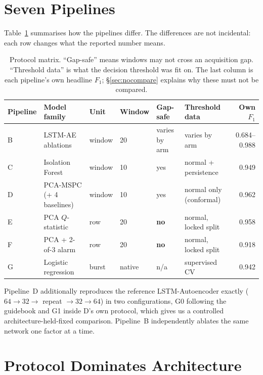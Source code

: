\documentclass{article}
\begin{document}
\section{Seven Pipelines}
\label{sec:pipelines}

Table~\ref{tab:protocols} summarises how the pipelines differ. The differences
are not incidental: each row changes what the reported number means.

\begin{table}[t]
\caption{Protocol matrix. ``Gap-safe'' means windows may not cross an
acquisition gap. ``Threshold data'' is what the decision threshold was fit on.
The last column is each pipeline's own headline $F_1$; \S\ref{sec:nocompare}
explains why these must not be compared.}
\label{tab:protocols}
\vskip 0.1in
\centering
\small
\begin{tabular}{llllllr}
\toprule
Pipeline & Model family & Unit & Window & Gap-safe & Threshold data & Own $F_1$ \\
\midrule
B  & LSTM-AE ablations        & window & 20     & varies by arm & varies by arm  & 0.684--0.988 \\
C  & Isolation Forest         & window & 10     & yes & normal + persistence   & 0.949 \\
D  & PCA-MSPC (+ 4 baselines) & window & 10     & yes & normal only (conformal) & 0.962 \\
E  & PCA $Q$-statistic        & row    & 20     & \textbf{no}  & normal, locked split & 0.958 \\
F  & PCA + 2-of-3 alarm       & row    & 20     & \textbf{no}  & normal, locked split & 0.918 \\
G  & Logistic regression      & burst  & native & n/a & supervised CV          & 0.942 \\
\bottomrule
\end{tabular}
\end{table}

Pipeline~D additionally reproduces the reference LSTM-Autoencoder exactly
($64\!\to\!32\!\to$ repeat $\to\!32\!\to\!64$) in two configurations, G0
following the guidebook and G1 inside D's own protocol, which gives us a
controlled architecture-held-fixed comparison. Pipeline~B independently ablates
the same network one factor at a time.

\section{Protocol Dominates Architecture}
\label{sec:protocol-effect}
\end{document}

